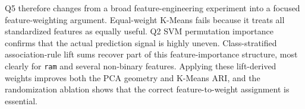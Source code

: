 \documentclass[11pt]{article}
\begin{document}
Q5 therefore changes from a broad feature-engineering experiment into a focused feature-weighting argument. Equal-weight K-Means fails because it treats all standardized features as equally useful. Q2 SVM permutation importance confirms that the actual prediction signal is highly uneven. Class-stratified association-rule lift sums recover part of this feature-importance structure, most clearly for \texttt{ram} and several non-binary features. Applying these lift-derived weights improves both the PCA geometry and K-Means ARI, and the randomization ablation shows that the correct feature-to-weight assignment is essential.
\end{document}
